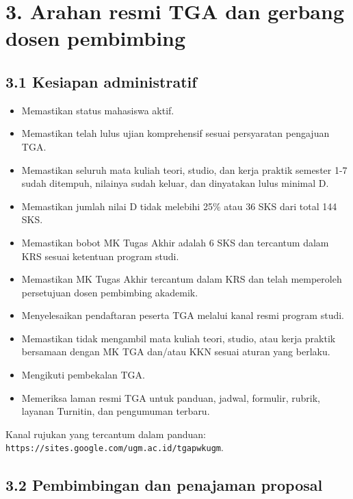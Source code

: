 \documentclass[
  indonesian,
  11pt,
]{article}
\providecommand{\tightlist}{%
  \setlength{\itemsep}{0pt}\setlength{\parskip}{0pt}}
\renewcommand{\tightlist}{%
  \setlength{\itemsep}{0.22em}%
  \setlength{\parskip}{0pt}%
}
\begin{document}
\section{3. Arahan resmi TGA dan gerbang dosen
pembimbing}\label{arahan-resmi-tga-dan-gerbang-dosen-pembimbing}

\subsection{3.1 Kesiapan administratif}\label{kesiapan-administratif}

\begin{itemize}
\tightlist
\item[$\square$]
  Memastikan status mahasiswa aktif.
\item[$\square$]
  Memastikan telah lulus ujian komprehensif sesuai persyaratan pengajuan
  TGA.
\item[$\square$]
  Memastikan seluruh mata kuliah teori, studio, dan kerja praktik
  semester 1-7 sudah ditempuh, nilainya sudah keluar, dan dinyatakan
  lulus minimal D.
\item[$\square$]
  Memastikan jumlah nilai D tidak melebihi 25\% atau 36 SKS dari total
  144 SKS.
\item[$\square$]
  Memastikan bobot MK Tugas Akhir adalah 6 SKS dan tercantum dalam KRS
  sesuai ketentuan program studi.
\item[$\square$]
  Memastikan MK Tugas Akhir tercantum dalam KRS dan telah memperoleh
  persetujuan dosen pembimbing akademik.
\item[$\square$]
  Menyelesaikan pendaftaran peserta TGA melalui kanal resmi program
  studi.
\item[$\square$]
  Memastikan tidak mengambil mata kuliah teori, studio, atau kerja
  praktik bersamaan dengan MK TGA dan/atau KKN sesuai aturan yang
  berlaku.
\item[$\square$]
  Mengikuti pembekalan TGA.
\item[$\square$]
  Memeriksa laman resmi TGA untuk panduan, jadwal, formulir, rubrik,
  layanan Turnitin, dan pengumuman terbaru.
\end{itemize}

Kanal rujukan yang tercantum dalam panduan:
\texttt{https://sites.google.com/ugm.ac.id/tgapwkugm}.

\subsection{3.2 Pembimbingan dan penajaman
proposal}\label{pembimbingan-dan-penajaman-proposal}
\end{document}
